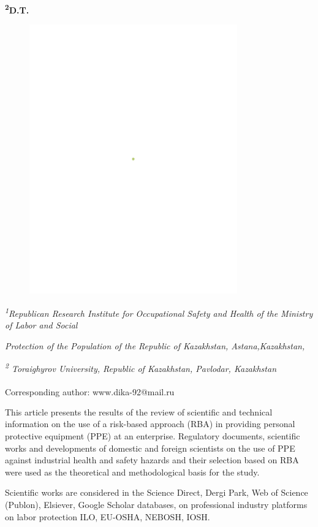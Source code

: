 {\bfseries \textsuperscript{2}D.T.
\begin{figure}[H]
	\centering
	\includegraphics[width=0.8\textwidth]{media/chem2/image1}
	\caption*{}
\end{figure}


\emph{\textsuperscript{1}Republican Research Institute for Occupational
Safety and Health of the Ministry of Labor and Social}

\emph{Protection of the Population of the Republic of Kazakhstan,
Astana,Kazakhstan,}

\emph{\textsuperscript{2} Toraighyrov University, Republic of
Kazakhstan, Pavlodar, Kazakhstan}

{\bfseries \textsuperscript{\envelope }}Corresponding author: www.dika-92@mail.ru

This article presents the results of the review of scientific and
technical information on the use of a risk-based approach (RBA) in
providing personal protective equipment (PPE) at an enterprise.
Regulatory documents, scientific works and developments of domestic and
foreign scientists on the use of PPE against industrial health and
safety hazards and their selection based on RBA were used as the
theoretical and methodological basis for the study.

Scientific works are considered in the Science Direct, Dergi Park, Web
of Science (Publon), Elsiever, Google Scholar databases, on professional
industry platforms on labor protection ILO, EU-OSHA, NEBOSH, IOSH.

}
